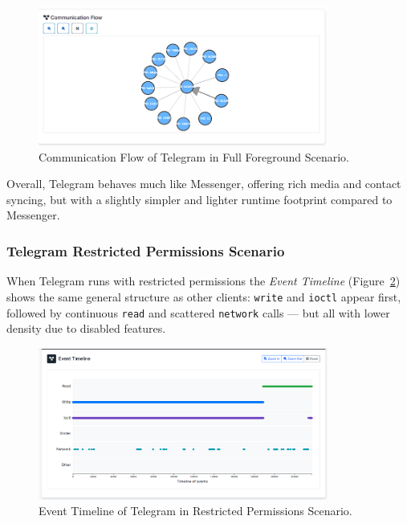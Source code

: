 \documentclass[a4paper,12pt]{report}
\begin{document}
\begin{figure}[H]
    \centering
    \includegraphics[width=0.85\textwidth]{telegram-full-flow.png}
    \caption{Communication Flow of Telegram in Full Foreground Scenario.}
    \label{fig:telegram-full-flow}
\end{figure}

Overall, Telegram behaves much like Messenger, offering rich media and contact syncing, but with a slightly simpler and lighter runtime footprint compared to Messenger.

\subsubsection{Telegram Restricted Permissions Scenario}

When Telegram runs with restricted permissions the \textit{Event Timeline} (Figure~\ref{fig:telegram-none-events}) shows the same general structure as other clients: \texttt{write} and \texttt{ioctl} appear first, followed by continuous \texttt{read} and scattered \texttt{network} calls — but all with lower density due to disabled features.

\begin{figure}[H]
    \centering
    \includegraphics[width=0.85\textwidth]{telegram-none-events.png}
    \caption{Event Timeline of Telegram in Restricted Permissions Scenario.}
    \label{fig:telegram-none-events}
\end{figure}
\end{document}
